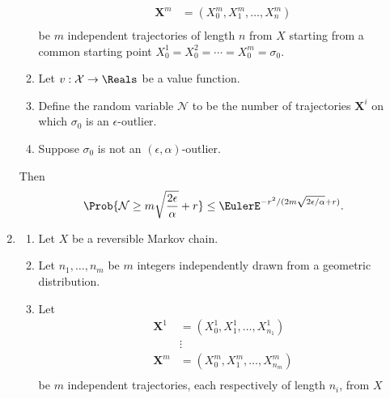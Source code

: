 \documentclass[12pt]{article}
\begin{document}
\begin{enumerate}
\begin{theorem}
\begin{enumerate}
\begin{align*}
                        \mathbf{X}^m &= (X_0^m, X_1^m, \dots, X_n^m )\\
                    \end{align*}
                    be \( m \) independent trajectories of length \( n \)
                    from \( X \) starting from a common starting point \(
                    X_0^1 = X_0^2 = \cdots = X_0^m = \sigma_0 \).
                \item
                    Let \( v :  \mathcal{X} \to \Reals \) be a value
                    function.
                \item
                    Define the random variable \( \mathcal{N} \) to be
                    the number of trajectories \( \mathbf{X}^i \) on
                    which \( \sigma_0 \) is an \( \epsilon \)-outlier.
                \item
                    Suppose \( \sigma_0 \) is not an \( (\epsilon,
                    \alpha) \)-outlier.
            \end{enumerate}
            Then
            \[
                \Prob{\mathcal{N} \ge m \sqrt{\frac{2\epsilon}{\alpha}}
                + r } \le \EulerE^{ -r^{2}/ (2 m\sqrt{2\epsilon/\alpha}
                + r)}.
            \]
        \end{theorem}
    \item
        \begin{theorem}
            \label{thm:parallelsignificance:thm6point1}
            \begin{enumerate}
                \item
                    Let \( X \) be a reversible Markov chain.
                \item
                    Let \( n_1, \dots, n_m \) be \( m \) integers
                    independently drawn from a geometric distribution.
                \item
                    Let
                    \begin{align*}
                        \mathbf{X}^1 &= (X_0^1, X_1^1, \dots, X_{n_1}^1
                        )\\
                        &\vdots \\
                        \mathbf{X}^m &= (X_0^m, X_1^m, \dots, X_{n_m}^m
                        )\\
                    \end{align*}
                    be \( m \) independent trajectories, each
                    respectively of length \( n_{i} \), from \( X \)

\end{enumerate}
\end{theorem}
\end{enumerate}
\end{document}
